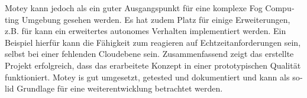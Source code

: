 \begin{otherlanguage}{ngerman}
Motey kann jedoch als ein guter Ausgangspunkt für eine komplexe Fog Computing Umgebung gesehen werden.
Es hat zudem Platz für einige Erweiterungen, z.B. für kann ein erweitertes autonomes Verhalten implementiert werden.
Ein Beispiel hierfür kann die Fähigkeit zum reagieren auf Echtzeitanforderungen sein, selbst bei einer fehlenden Cloudebene sein.
Zusammenfassend zeigt das erstellte Projekt erfolgreich, dass das erarbeitete Konzept in einer prototypischen Qualität funktioniert.
Motey is gut umgesetzt, getested und dokumentiert und kann als solid Grundlage für eine weiterentwicklung betrachtet werden.
\end{otherlanguage}
